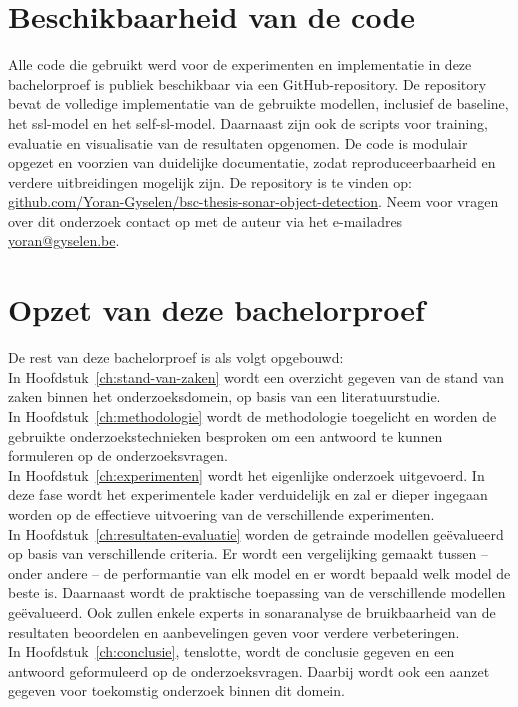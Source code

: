 \section{Beschikbaarheid van de code}

Alle code die gebruikt werd voor de experimenten en implementatie in deze bachelorproef is publiek beschikbaar via een GitHub-repository. De repository bevat de volledige implementatie van de gebruikte modellen, inclusief de baseline, het \gls{ssl}-model en het \gls{self-sl}-model. Daarnaast zijn ook de scripts voor training, evaluatie en visualisatie van de resultaten opgenomen. De code is modulair opgezet en voorzien van duidelijke documentatie, zodat reproduceerbaarheid en verdere uitbreidingen mogelijk zijn. De repository is te vinden op: \href{https://github.com/Yoran-Gyselen/bsc-thesis-sonar-object-detection}{github.com/Yoran-Gyselen/bsc-thesis-sonar-object-detection}. Neem voor vragen over dit onderzoek contact op met de auteur via het e-mailadres \href{mailto:yoran@gyselen.be}{yoran@gyselen.be}.

\section{Opzet van deze bachelorproef}%
\label{sec:opzet-bachelorproef}

De rest van deze bachelorproef is als volgt opgebouwd: \\

In Hoofdstuk~\ref{ch:stand-van-zaken} wordt een overzicht gegeven van de stand van zaken binnen het onderzoeksdomein, op basis van een literatuurstudie. \\

In Hoofdstuk~\ref{ch:methodologie} wordt de methodologie toegelicht en worden de gebruikte onderzoekstechnieken besproken om een antwoord te kunnen formuleren op de onderzoeksvragen. \\

In Hoofdstuk~\ref{ch:experimenten} wordt het eigenlijke onderzoek uitgevoerd. In deze fase wordt het experimentele kader verduidelijk en zal er dieper ingegaan worden op de effectieve uitvoering van de verschillende experimenten. \\

In Hoofdstuk~\ref{ch:resultaten-evaluatie} worden de getrainde modellen geëvalueerd op basis van verschillende criteria. Er wordt een vergelijking gemaakt tussen -- onder andere -- de performantie van elk model en er wordt bepaald welk model de beste is. Daarnaast wordt de praktische toepassing van de verschillende modellen geëvalueerd. Ook zullen enkele experts in sonaranalyse de bruikbaarheid van de resultaten beoordelen en aanbevelingen geven voor verdere verbeteringen. \\

In Hoofdstuk~\ref{ch:conclusie}, tenslotte, wordt de conclusie gegeven en een antwoord geformuleerd op de onderzoeksvragen. Daarbij wordt ook een aanzet gegeven voor toekomstig onderzoek binnen dit domein.
